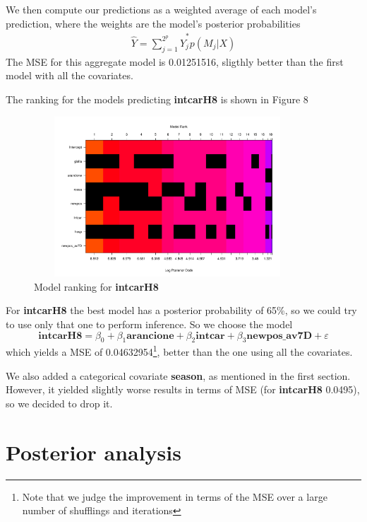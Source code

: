 \documentclass[12pt,a4paper]{article}
\theoremstyle{definition}
\theoremstyle{remark}
\begin{document}
We then compute our predictions as a weighted average of each model's prediction, where the weights are the model's posterior probabilities
\begin{align*}
	\hat{Y} = \sum_{j=1}^{2^p}\hat{Y}^*_jp(M_j|X)
\end{align*}
The MSE for this aggregate model is 0.01251516, sligthly better than the first model with all the covariates.



The ranking for the models predicting \textbf{intcarH8} is shown in Figure 8
\begin{figure}[htb!]
	\centering
	\includegraphics[width=100mm, height=60mm,scale=0.5]{ranking2.pdf}
	\caption{Model ranking for \textbf{intcarH8} }
\end{figure}


For \textbf{intcarH8} the best model has a posterior probability of 65\%, so we could try to use only that one to perform inference. So we choose the model
\begin{dmath*}
	\textbf{intcarH8} = \beta_0 + \beta_1\textbf{arancione} +  \beta_2\textbf{intcar} + \beta_3\textbf{newpos\_av7D} + \varepsilon
\end{dmath*}
which yields a MSE of 0.04632954\footnote{Note that we judge the improvement in terms of the MSE over a large number of shufflings and iterations}, better than the one using all the covariates.

We also added a categorical covariate \textbf{season}, as mentioned in the first section. However, it yielded slightly worse results in terms of MSE (for \textbf{intcarH8} 0.0495), so we decided to drop it. 
\newpage
\section{Posterior analysis}
\end{document}
